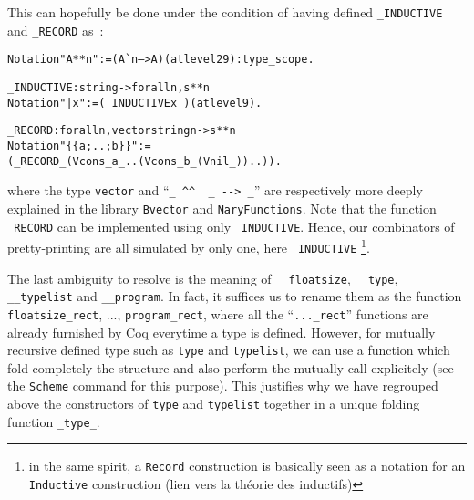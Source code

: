 \documentclass[a4paper, 11pt]{article}
\newenvironment{coq}
  {%
   \begin{alltt}} %% 8.3pl1 (January 2011)
  {\end{alltt} %
  }
\begin{document}
This can hopefully be done under the condition of having defined \verb|_INDUCTIVE| and \verb|_RECORD| as~:
\begin{coq}
  Notation "A ** n" := (A ^^ n --> A) (at level 29) : type_scope.

_INDUCTIVE : string -> forall n, s ** n
  Notation "| x" := (_INDUCTIVE x _) (at level 9).

_RECORD : forall n, vector string n -> s ** n
  Notation "\{\{ a ; .. ; b \}\}" := 
    (_RECORD _ (Vcons _ a _ .. (Vcons _ b _ (Vnil _)) ..)).
\end{coq}
where the type \verb|vector| and ``\verb|_ ^^  _ --> _|'' are respectively more deeply explained in the library \verb|Bvector| and \verb|NaryFunctions|.
Note that the function \verb|_RECORD| can be implemented using only \verb|_INDUCTIVE|. Hence, our combinators of pretty-printing are all simulated by only one, here \verb|_INDUCTIVE|
 \footnote{in the same spirit, a {\tt Record} construction is basically seen as a notation for an {\tt Inductive} construction (lien vers la théorie des inductifs)}.

The last ambiguity to resolve is the meaning of \verb|__floatsize|, \verb|__type|, \verb|__typelist| and \verb|__program|. In fact, it suffices us to rename them as the function \verb|floatsize_rect|, ..., \verb|program_rect|, where all the ``\verb|..._rect|'' functions are already furnished by Coq everytime a type is defined. However, for mutually recursive defined type such as \verb|type| and \verb|typelist|, we can use a function which fold completely the structure and also perform the mutually call explicitely (see the \verb|Scheme| command for this purpose). This justifies why we have regrouped above the constructors of \verb|type| and \verb|typelist| together in a unique folding function \verb|_type_|.
\end{document}
